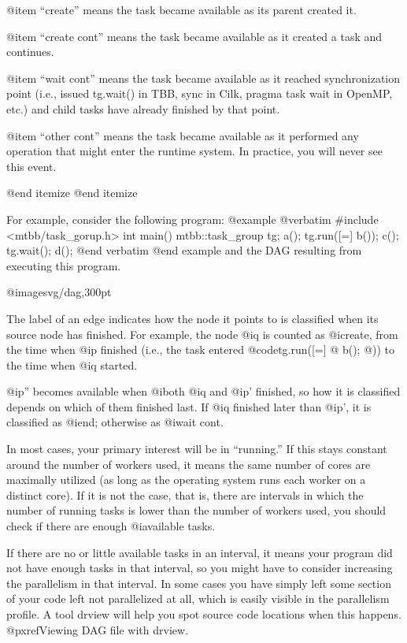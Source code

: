 @item ``create'' means the task became available as its parent created it.

@item ``create cont'' means the task became available as it created a task and continues.

@item ``wait cont'' means the task became available as it reached synchronization point (i.e., issued tg.wait() in TBB, sync in Cilk, pragma task wait in OpenMP, etc.) and child tasks have already finished by that point.

@item ``other cont'' means the task became available as it performed any operation that might enter the runtime system.  In practice, you will never see this event.

@end itemize
@end itemize

For example, consider the following program:
@example
@verbatim
#include <mtbb/task_gorup.h>
int main() {
  mtbb::task_group tg;
  a();
  tg.run([=] b());
  c();
  tg.wait();
  d();
}
@end verbatim
@end example
and the DAG resulting from executing this program.

@image{svg/dag,300pt}

The label of an edge indicates how the node it points to is classified
when its source node has finished.  For example, the node @i{q} is
counted as @i{create}, from the time when @i{p} finished (i.e., the task
entered @code{tg.run([=] @{ b(); @})}) to the time when @i{q} started.

@i{p''} becomes available when @i{both} @i{q} and @i{p'} finished, so
how it is classified depends on which of them finished last.  If @i{q}
finished later than @i{p'}, it is classified as @i{end}; otherwise as
@i{wait cont}.

In most cases, your primary interest will be in ``running.''  If this
stays constant around the number of workers used, it means the same
number of cores are maximally utilized (as long as the operating system
runs each worker on a distinct core).  If it is not the case, that is,
there are intervals in which the number of running tasks is lower than
the number of workers used, you should check if there are enough
@i{available} tasks.

If there are no or little available tasks in an interval, it means your
program did not have enough tasks in that interval, so you might have to
consider increasing the parallelism in that interval.  In some cases you
have simply left some section of your code left not parallelized at all,
which is easily visible in the parallelism profile.  A tool drview will
help you spot source code locations when this happens.  
@pxref{Viewing DAG file with drview}.

